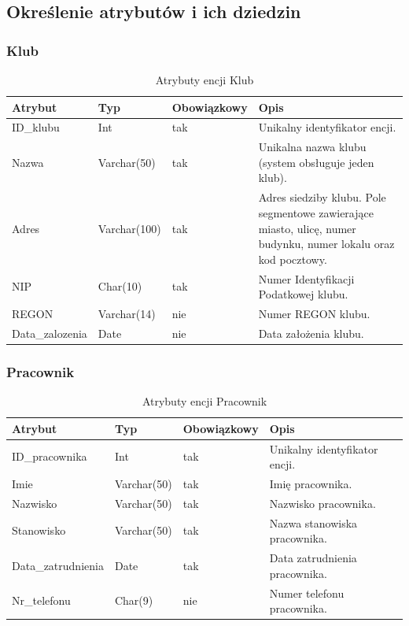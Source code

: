 \documentclass[11pt,a4paper]{article}
\begin{document}
\subsection{Określenie atrybutów i ich dziedzin}
\subsubsection{Klub}
\begin{table}[H]
\centering
\small
\begin{tabularx}{\textwidth}{|L{3cm}|L{2.25cm}|C{2.67cm}|X|}
\hline
\textbf{Atrybut} & \textbf{Typ} & \textbf{Obowiązkowy} & \textbf{Opis} \\
\hline
ID\_klubu & Int & tak & Unikalny identyfikator encji. \\
\hline
Nazwa & Varchar(50) & tak & Unikalna nazwa klubu (system obsługuje jeden klub). \\
\hline
Adres & Varchar(100) & tak & Adres siedziby klubu. Pole segmentowe zawierające miasto, ulicę,
numer budynku, numer lokalu oraz kod pocztowy. \\
\hline
NIP & Char(10) & tak & Numer Identyfikacji Podatkowej klubu. \\
\hline
REGON & Varchar(14) & nie & Numer REGON klubu. \\
\hline
Data\_zalozenia & Date & nie & Data założenia klubu. \\
\hline
\end{tabularx}
\caption{Atrybuty encji Klub}
\label{tab:atrybuty-encja-klub}
\end{table}

\subsubsection{Pracownik}
\begin{table}[H]
\centering
\small
\begin{tabularx}{\textwidth}{|L{3cm}|L{2.25cm}|C{2.67cm}|X|}
\hline
\textbf{Atrybut} & \textbf{Typ} & \textbf{Obowiązkowy} & \textbf{Opis} \\
\hline
ID\_pracownika & Int & tak & Unikalny identyfikator encji. \\
\hline
Imie & Varchar(50) & tak & Imię pracownika. \\
\hline
Nazwisko & Varchar(50) & tak & Nazwisko pracownika. \\
\hline
Stanowisko & Varchar(50) & tak & Nazwa stanowiska pracownika. \\
\hline
Data\_zatrudnienia & Date & tak & Data zatrudnienia pracownika. \\
\hline
Nr\_telefonu & Char(9) & nie & Numer telefonu pracownika. \\
\hline
\end{tabularx}
\caption{Atrybuty encji Pracownik}
\label{tab:atrybuty-encja-pracownik}
\end{table}
\end{document}
